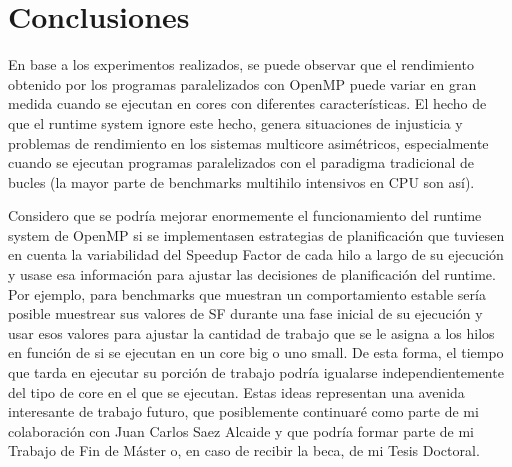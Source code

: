 \section{Conclusiones}\label{sec:conclu}

En base a los experimentos realizados, se puede observar que el rendimiento obtenido por los programas paralelizados con OpenMP puede variar en gran medida cuando se ejecutan en cores con diferentes características. El hecho de que el runtime system ignore este hecho, genera situaciones de injusticia y problemas de rendimiento en los sistemas multicore asimétricos, especialmente cuando se ejecutan programas paralelizados con el paradigma tradicional de bucles (la mayor parte de benchmarks multihilo intensivos en CPU son así).

Considero que se podría mejorar enormemente el funcionamiento del runtime system de OpenMP si se implementasen estrategias de planificación que tuviesen en cuenta la variabilidad del Speedup Factor de cada hilo a largo de su ejecución y usase esa información para ajustar las decisiones de planificación del runtime. Por ejemplo, para benchmarks que muestran un comportamiento estable sería posible muestrear sus valores de SF durante una fase inicial de su ejecución y usar esos valores para ajustar la cantidad de trabajo que se le asigna a los hilos en función de si se ejecutan en un core big o uno small. De esta forma, el tiempo que tarda en ejecutar su porción de trabajo podría igualarse independientemente del tipo de core en el que se ejecutan. Estas ideas representan una avenida interesante de trabajo futuro, que posiblemente continuaré como parte de mi colaboración con Juan Carlos Saez Alcaide y que podría formar parte de mi Trabajo de Fin de Máster o, en caso de recibir la beca, de mi Tesis Doctoral.



